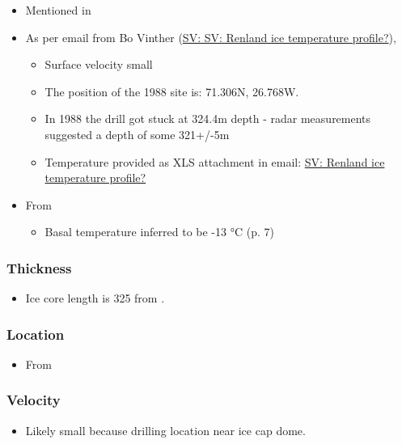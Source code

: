 \documentclass[article,a4paper,times,11pt,twoside]{article}
\begin{document}
\begin{itemize}
\item Mentioned in \textcite{vinther_2008}
\item As per email from Bo Vinther (\href{msgid:2033620922.1391238.1606871518421@titapp04}{SV: SV: Renland ice temperature profile?}),
\begin{itemize}
\item Surface velocity small
\item The position of the 1988 site is: 71.306N, 26.768W.
\item In 1988 the drill got stuck at 324.4m depth - radar measurements suggested a depth of some 321+/-5m \autocite{johnsen_1992}
\item Temperature provided as XLS attachment in email: \href{msgid:9d866df4f1bc4dd8aaa1216ad90406dc@nbi.ku.dk}{SV: Renland ice temperature profile?}
\end{itemize}
\item From \textcite{johnsen_1992}
\begin{itemize}
\item Basal temperature inferred to be -13 °C (p. 7)
\end{itemize}
\end{itemize}

\subsubsection{Thickness}
\label{sec:org4d449c3}

\begin{itemize}
\item Ice core length is 325 from \textcite{vinther_2008}.
\end{itemize}

\subsubsection{Location}
\label{sec:org8dc7fdb}

\begin{itemize}
\item From \textcite{vinther_2008}
\end{itemize}

\subsubsection{Velocity}
\label{sec:orgc7412ef}

\begin{itemize}
\item Likely small because drilling location near ice cap dome.
\end{itemize}
\clearpage
\end{document}
